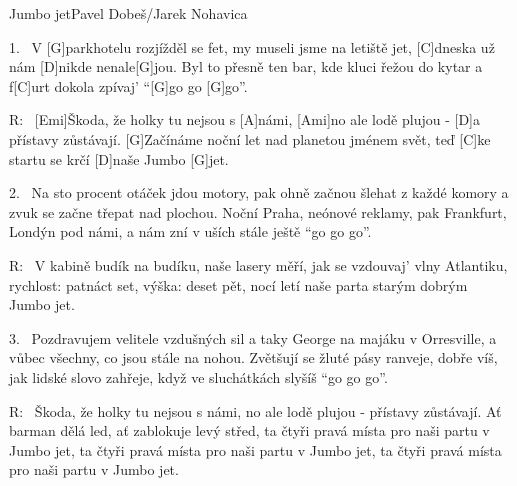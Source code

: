 \begin{song}{Jumbo jet}{Pavel Dobeš/Jarek Nohavica}

\begin{xverse}{1.~}
V [\large G]parkhotelu rozjížděl se fet,
my museli jsme na letiště jet,
[\large C]dneska už nám [\large D]nikde nenale[\large G]jou.
Byl to přesně ten bar,
kde kluci řežou do kytar
a f[\large C]urt dokola zpívaj' ``[\large G]go go [\large G]go''.
\end{xverse}

\begin{xverse}{R:~}
[\large Emi]{Ško}da, že holky tu nejsou s [\large A]námi,
[\large Ami]no ale lodě plujou - [\large D]a přístavy zůstávají.
[\large G]Začínáme noční let nad planetou jménem svět,
teď [\large C]ke startu se krčí [\large D]naše Jumbo [\large G]jet.
\end{xverse}

\begin{xverse}{2.~}
Na sto procent otáček jdou motory,
pak ohně začnou šlehat z každé komory
a zvuk se začne třepat nad plochou.
Noční Praha, neónové reklamy, pak Frankfurt, Londýn pod námi,
a nám zní v uších stále ještě ``go go go''.
\end{xverse}

\begin{xverse}{R:~}
V kabině budík na budíku,
naše lasery měří, jak se vzdouvaj' vlny Atlantiku,
rychlost: patnáct set, výška: deset pět,
   nocí letí naše parta starým dobrým Jumbo jet.
\end{xverse}

\begin{xverse}{3.~}
Pozdravujem velitele vzdušných sil
a taky George na majáku v Orresville,
a vůbec všechny, co jsou stále na nohou.
Zvětšují se žluté pásy ranveje,
dobře víš, jak lidské slovo zahřeje,
když ve sluchátkách slyšíš ``go go go''.
\end{xverse}

\begin{xverse}{R:~}
Škoda, že holky tu nejsou s námi,
no ale lodě plujou - přístavy zůstávají.
Ať barman dělá led, ať zablokuje levý střed,
ta čtyři pravá místa pro naši partu v Jumbo jet,
ta čtyři pravá místa pro naši partu v Jumbo jet,
ta čtyři pravá místa pro naši partu v Jumbo jet.
\end{xverse}

\end{song}




